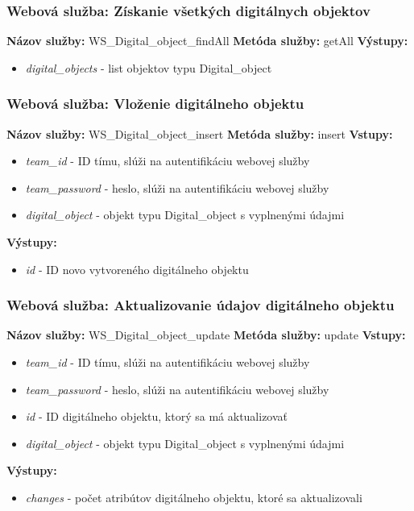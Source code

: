 \documentclass[10pt,oneside,slovak,a4paper]{article}
\begin{document}
\subsubsection{Webová služba: Získanie všetkých digitálnych objektov}
\textbf{Názov služby:} WS\_Digital\_object\_findAll
\textbf{Metóda služby:} getAll
\textbf{Výstupy:}
	\begin{itemize}
		\item \textit{digital\_objects} - list objektov typu Digital\_object
	\end{itemize}
	
\subsubsection{Webová služba: Vloženie digitálneho objektu}
\textbf{Názov služby:} WS\_Digital\_object\_insert
\textbf{Metóda služby:} insert
\textbf{Vstupy:}
	\begin{itemize}
		\item \textit{team\_id} - ID tímu, slúži na autentifikáciu webovej služby
		\item \textit{team\_password} - heslo, slúži na autentifikáciu webovej služby
		\item \textit{digital\_object} - objekt typu Digital\_object s vyplnenými údajmi
	\end{itemize}
\textbf{Výstupy:}
	\begin{itemize}
		\item \textit{id} - ID novo vytvoreného digitálneho objektu
	\end{itemize}
	
\subsubsection{Webová služba: Aktualizovanie údajov digitálneho objektu}
\textbf{Názov služby:} WS\_Digital\_object\_update
\textbf{Metóda služby:} update
\textbf{Vstupy:}
	\begin{itemize}
		\item \textit{team\_id} - ID tímu, slúži na autentifikáciu webovej služby
		\item \textit{team\_password} - heslo, slúži na autentifikáciu webovej služby
		\item \textit{id} - ID digitálneho objektu, ktorý sa má aktualizovať
		\item \textit{digital\_object} - objekt typu Digital\_object s vyplnenými údajmi
	\end{itemize}
\textbf{Výstupy:}
	\begin{itemize}
		\item \textit{changes} - počet atribútov digitálneho objektu, ktoré sa aktualizovali
	\end{itemize}
	
\end{document}
